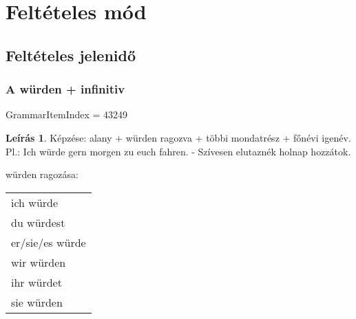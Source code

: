 \documentclass{article}
\theoremstyle{definition}
\newtheorem*{desc}{Leírás}
\begin{document}
\section{Feltételes mód}

\subsection{Feltételes jelenidő}

\subsubsection{A würden + infinitiv}

GrammarItemIndex = 43249

\begin{desc}
Képzése: alany + würden ragozva + többi mondatrész + főnévi igenév.
Pl.: Ich würde gern morgen zu euch fahren. - Szívesen elutaznék holnap hozzátok.

würden ragozása:
\begin{tabular}{l}
ich würde\\
du würdest\\
er/sie/es würde\\
wir würden\\
ihr würdet\\
sie würden\\
\end{tabular}
\end{desc}
\end{document}
